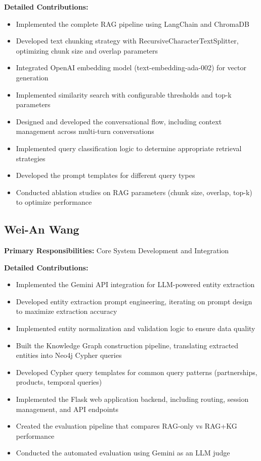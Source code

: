 \documentclass[11pt,twocolumn]{article}
\begin{document}
\textbf{Detailed Contributions:}
\begin{itemize}
\item Implemented the complete RAG pipeline using LangChain and ChromaDB
\item Developed text chunking strategy with RecursiveCharacterTextSplitter, optimizing chunk size and overlap parameters
\item Integrated OpenAI embedding model (text-embedding-ada-002) for vector generation
\item Implemented similarity search with configurable thresholds and top-k parameters
\item Designed and developed the conversational flow, including context management across multi-turn conversations
\item Implemented query classification logic to determine appropriate retrieval strategies
\item Developed the prompt templates for different query types
\item Conducted ablation studies on RAG parameters (chunk size, overlap, top-k) to optimize performance
\end{itemize}

\subsection{Wei-An Wang}

\textbf{Primary Responsibilities:} Core System Development and Integration

\textbf{Detailed Contributions:}
\begin{itemize}
\item Implemented the Gemini API integration for LLM-powered entity extraction
\item Developed entity extraction prompt engineering, iterating on prompt design to maximize extraction accuracy
\item Implemented entity normalization and validation logic to ensure data quality
\item Built the Knowledge Graph construction pipeline, translating extracted entities into Neo4j Cypher queries
\item Developed Cypher query templates for common query patterns (partnerships, products, temporal queries)
\item Implemented the Flask web application backend, including routing, session management, and API endpoints
\item Created the evaluation pipeline that compares RAG-only vs RAG+KG performance
\item Conducted the automated evaluation using Gemini as an LLM judge
\end{itemize}
\end{document}
